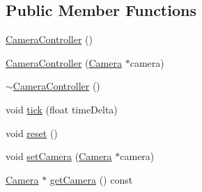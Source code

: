 \subsection*{Public Member Functions}
\begin{DoxyCompactItemize}
\item 
\mbox{\hyperlink{classec_1_1_camera_controller_a53fd061c49374fd8f1194cecac1e35aa}{Camera\+Controller}} ()
\item 
\mbox{\hyperlink{classec_1_1_camera_controller_a9edd8fff13533c84c7ea8f7f10f16580}{Camera\+Controller}} (\mbox{\hyperlink{classec_1_1_camera}{Camera}} $\ast$camera)
\item 
\mbox{\hyperlink{classec_1_1_camera_controller_a3229bd664f0d7d00b90fc3c9a852768c}{$\sim$\+Camera\+Controller}} ()
\item 
void \mbox{\hyperlink{classec_1_1_camera_controller_a82055ad6c8797937a8ec17234ab08758}{tick}} (float time\+Delta)
\item 
void \mbox{\hyperlink{classec_1_1_camera_controller_a10d1642f398f155fa06c4c74961fe91f}{reset}} ()
\item 
void \mbox{\hyperlink{classec_1_1_camera_controller_a74d3b80913b69dce0bae61a651c3b49b}{set\+Camera}} (\mbox{\hyperlink{classec_1_1_camera}{Camera}} $\ast$camera)
\item 
\mbox{\hyperlink{classec_1_1_camera}{Camera}} $\ast$ \mbox{\hyperlink{classec_1_1_camera_controller_a8d6e5c646108c0bf5abc25df3dd77c38}{get\+Camera}} () const
\end{DoxyCompactItemize}
